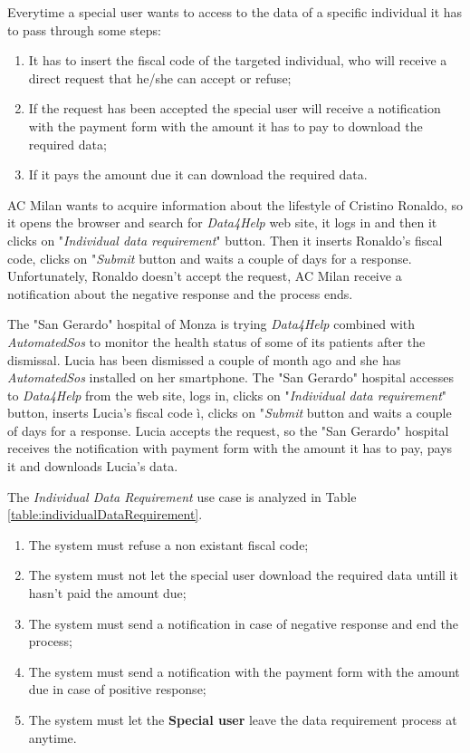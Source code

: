 Everytime a special user wants to access to the data of a specific individual it has to pass through some steps:
\begin{enumerate}
  \item It has to insert the fiscal code of the targeted individual, who will receive a direct request that he/she can accept or refuse;
  \item If the request has been accepted the special user will receive a notification with the payment form with the amount it has to pay to download the required data;
  \item If it pays the amount due it can download the required data.
\end{enumerate}

AC Milan wants to acquire information about the lifestyle of Cristino Ronaldo, so it opens the browser and search for \textit{Data4Help} web site, it logs in and then it clicks on "\textit{Individual data requirement}" button. Then it inserts Ronaldo's fiscal code, clicks on "\textit{Submit} button and waits a couple of days for a response. Unfortunately, Ronaldo doesn't accept the request, AC Milan receive a notification about the negative response and the process ends.

The "San Gerardo" hospital of Monza is trying \textit{Data4Help} combined with \textit{AutomatedSos} to monitor the health status of some of its patients after the dismissal. Lucia has been dismissed a couple of month ago and she has \textit{AutomatedSos} installed on her smartphone. The "San Gerardo" hospital accesses to \textit{Data4Help} from the web site, logs in, clicks on "\textit{Individual data requirement}" button, inserts Lucia's fiscal code ì, clicks on "\textit{Submit} button and waits a couple of days for a response. Lucia accepts the request, so the "San Gerardo" hospital receives the notification with payment form with the amount it has to pay, pays it and downloads Lucia's data.

The \textit{Individual Data Requirement} use case is analyzed in Table \ref{table:individualDataRequirement}.

\begin{enumerate}
  \item The system must refuse a non existant fiscal code;
  \item The system must not let the special user download the required data untill it hasn't paid the amount due;
  \item The system must send a notification in case of negative response and end the process;
  \item The system must send a notification with the payment form with the amount due in case of positive response;
  \item The system must let the \textbf{Special user} leave the data requirement process at anytime.
\end{enumerate}

